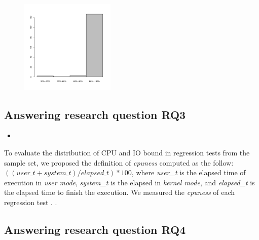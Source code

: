 \begin{figure}[h!]
    \centering
    \includegraphics[width=0.4\textwidth]{figs/tcdistrib.pdf}
    \caption{}
\end{figure}

\subsection{Answering research question RQ3}
\label{sec:rqThree}

\begin{itemize}
    \item \RQB
\end{itemize}

To evaluate the distribution of CPU and IO bound in regression tests
from the sample set, we proposed the definition of \emph{cpuness}
computed as the follow: $((user\_t + system\_t) / elapsed\_t) * 100$,
where \emph{user\_t} is the elapsed time of execution in \emph{user
mode}, \emph{system\_t} is the elapsed in \emph{kernel mode}, and
\emph{elapsed\_t} is the elapsed time to finish the execution. We
measured the \emph{cpuness} of each regression test  .  .  

\subsection{Answering research question RQ4}
\label{sec:rqfour}



